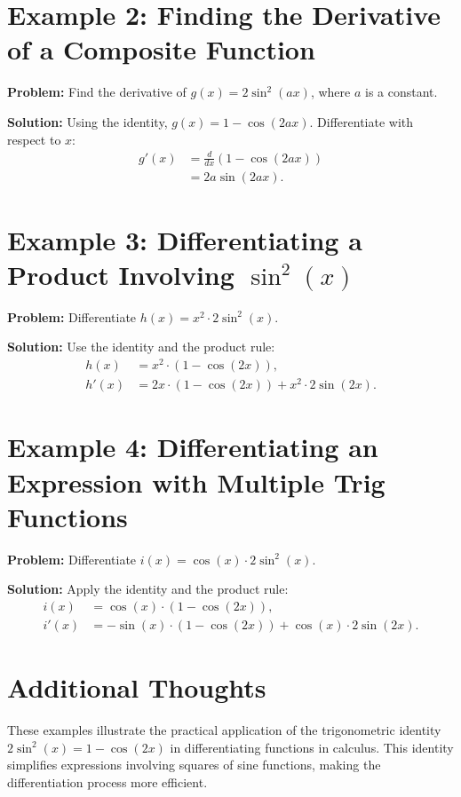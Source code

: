\documentclass[a4paper,12pt]{book}
\newcounter{example}
\begin{document}
\section*{Example 2: Finding the Derivative of a Composite Function}
\textbf{Problem:} Find the derivative of \(g(x) = 2 \sin^2(ax)\), where \(a\) is a constant.

\textbf{Solution:}
Using the identity, \(g(x) = 1 - \cos(2ax)\). Differentiate with respect to \(x\):
\begin{align*}
g'(x) &= \frac{d}{dx}(1 - \cos(2ax)) \\
&= 2a \sin(2ax).
\end{align*}

\section*{Example 3: Differentiating a Product Involving \(\sin^2(x)\)}
\textbf{Problem:} Differentiate \(h(x) = x^2 \cdot 2 \sin^2(x)\).

\textbf{Solution:}
Use the identity and the product rule:
\begin{align*}
h(x) &= x^2 \cdot (1 - \cos(2x)), \\
h'(x) &= 2x \cdot (1 - \cos(2x)) + x^2 \cdot 2 \sin(2x).
\end{align*}

\section*{Example 4: Differentiating an Expression with Multiple Trig Functions}
\textbf{Problem:} Differentiate \(i(x) = \cos(x) \cdot 2 \sin^2(x)\).

\textbf{Solution:}
Apply the identity and the product rule:
\begin{align*}
i(x) &= \cos(x) \cdot (1 - \cos(2x)), \\
i'(x) &= -\sin(x) \cdot (1 - \cos(2x)) + \cos(x) \cdot 2 \sin(2x).
\end{align*}

\section*{Additional Thoughts}
These examples illustrate the practical application of the trigonometric identity \(2 \sin^2(x) = 1 - \cos(2x)\) in differentiating functions in calculus. This identity simplifies expressions involving squares of sine functions, making the differentiation process more efficient.
\end{document}

